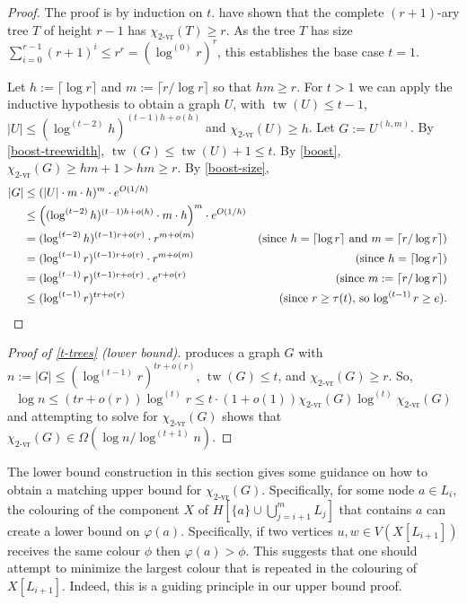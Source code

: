 \documentclass[kpfonts]{patmorin}
\DeclareMathOperator{\tw}{tw}
\newcommand{\rn}[1]{\chi_{\operatorname{#1-vr}}}
\newcommand{\trn}{\rn{2}}
\theoremstyle{named}
\begin{document}
\begin{proof}
    The proof is by induction on $t$.  \citet{karpas.neiman.ea:on} have shown that the complete $(r+1)$-ary tree $T$ of height $r-1$ has $\trn(T)\ge r$. As the tree $T$ has size $\sum_{i=0}^{r-1} (r+1)^i \le r^r=(\log^{(0)}r)^{r}$,  this establishes the base case $t=1$.

    Let $h:=\lceil\log r\rceil$ and $m:=\lceil r/\log r\rceil$ so that $hm\ge r$.  For $t>1$ we can apply the inductive hypothesis to obtain a graph $U$, with $\tw(U)\le t-1$, $|U|\le (\log^{(t-2)} h)^{(t-1)h+o(h)}$ and $\trn(U)\ge h$. Let $G:=U^{(h,m)}$.  By \cref{boost-treewidth}, $\tw(G)\le \tw(U)+1\le t$.  By \cref{boost}, $\trn(G)\ge hm+1 > hm \ge r$. By \cref{boost-size},
    \begin{align*}
        |G| & \le (|U|\cdot m\cdot h)^{m}\cdot e^{O(1/h)} \\
        & \le \left((\log^{(t-2)} h)^{(t-1)h + o(h)}\cdot m\cdot h\right)^{m}\cdot e^{O(1/h)} \\
        & = (\log^{(t-2)} h)^{(t-1)r + o(r)}\cdot r^{m+o(m)}
        & \text{(since $h=\lceil\log r\rceil$ and $m=\lceil r/\log r\rceil$)}\\
        & = (\log^{(t-1)} r)^{(t-1)r + o(r)}\cdot r^{m+o(m)}
         & \text{(since $h=\lceil\log r\rceil$)} \\
        & = (\log^{(t-1)} r)^{(t-1)r + o(r)}\cdot e^{r+o(r)}
        & \text{(since $m:=\lceil r/\log r\rceil$)}\\
        & \le (\log^{(t-1)} r)^{tr + o(r)} & \text{(since $r\ge \tau(t)$, so $\log^{(t-1)} r\ge e$).} & \qedhere
    \end{align*}
\end{proof}

\begin{proof}[Proof of \cref{t-trees} (lower bound)]
     produces a graph $G$ with $n:=|G|\le (\log^{(t-1)} r)^{tr+o(r)}$, $\tw(G)\le t$, and $\trn(G)\ge r$.  So,
    \[
        \log n \le (tr+o(r))\log^{(t)} r
        \le t\cdot(1+o(1))\trn(G)\log^{(t)} \trn(G)
    \]
    and attempting to solve for $\trn(G)$ shows that $\trn(G)\in \Omega(\log n/\log^{(t+1)} n)$.
\end{proof}

The lower bound construction in this section gives some guidance on how to obtain a matching upper bound for $\trn(G)$.  Specifically, for some node $a\in L_i$, the colouring of the component $X$ of $H[\{a\}\cup\bigcup_{j=i+1}^m L_j]$ that contains $a$ can create a lower bound on $\varphi(a)$.  Specifically, if two vertices $u,w\in V(X[L_{i+1}])$ receives the same colour $\phi$ then $\varphi(a)>\phi$.  This suggests that one should attempt to minimize the largest colour that is repeated in the colouring of $X[L_{i+1}]$.  Indeed, this is a guiding principle in our upper bound proof.
\end{document}
